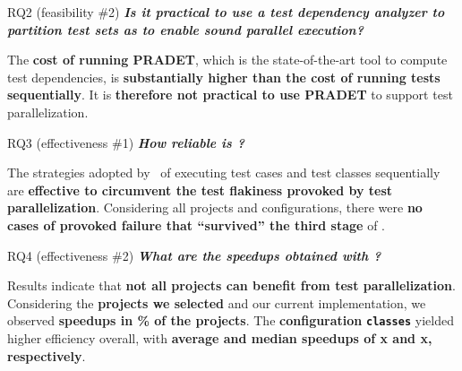 \documentclass{beamer}
\begin{document}
\begin{frame}{RQ2 (feasibility \#2)}
\textbf{\textit{Is it practical to use a test dependency analyzer to partition test sets as to enable sound parallel execution?}}\pause
\begin{center}
	\begin{tcolorbox}
		The \textbf{\color{red}cost of running PRADET}, which is the state-of-the-art tool to compute test dependencies, is \textbf{\color{red}substantially higher than the cost of running tests sequentially}. It is \textbf{\color{red}therefore not practical to use PRADET} to support test parallelization.
	\end{tcolorbox}
\end{center}
\end{frame}

\begin{frame}{RQ3 (effectiveness \#1)}
\textbf{\textit{How reliable is \tname?}}
\begin{center}\pause
	\begin{tcolorbox}
		The strategies adopted by \tname\ of executing test cases and test classes sequentially are \textbf{\color{red}effective to circumvent the test flakiness provoked by test parallelization}. Considering all projects and configurations, there were \textbf{\color{red}no cases of provoked failure that ``survived'' the third stage} of \tname.
	\end{tcolorbox}
\end{center}
\end{frame}

\begin{frame}{RQ4 (effectiveness \#2)}
\textbf{\textit{What are the speedups obtained with \tname?}}
\begin{center}\pause
	\begin{tcolorbox}
		Results indicate that \textbf{\color{red}not all projects can benefit from test parallelization}. Considering the \textbf{\color{red}projects we selected} and our current implementation, we observed \textbf{\color{red}speedups in \FrequencySpeedups\% of the projects}. The {\color{red}\textbf{configuration} \texttt{\textbf{classes}}} yielded higher efficiency overall, with \textbf{\color{red}average and median speedups of \SpeedupClassesAvg{}x and \SpeedupClassesMedian{}x, respectively}.
	\end{tcolorbox}
\end{center}
\end{frame}
\end{document}
